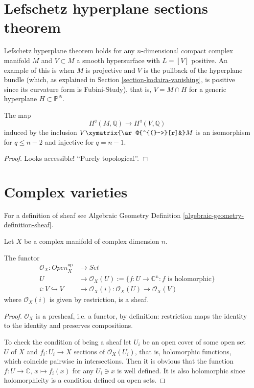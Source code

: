 \documentclass{book}
\begin{document}
\section{Lefschetz hyperplane sections
theorem}
\label{section-lefschetz-hyperplane}

Lefschetz hyperplane theorem holds for
any $n$-dimensional compact complex manifold
$M$
and $V \subset M$ a smooth hypersurface with
$L=[V]$ positive.
An example of this is when $M$ is projective
and $V$ is the pullback of the hyperplane
bundle
(which, as explained in Section
\ref{section-kodaira-vanishing},
is positive since its curvature form is
Fubini-Study),
that is, $V=M \cap H$ for a generic
hyperplane $H \subset \mathbb{P}^N$.

\begin{theorem}
\label{theorem-lefschetz-hyperplane}
The map
$$
H^q(M,\mathbb{Q}) \to H^q(V,\mathbb{Q})
$$
induced by the inclusion $V
\xymatrix{\ar@{^{(}->}[r]&} M$
is an isomorphism for $q \leq  n-2$
and injective for $q=n-1$.
\end{theorem}

\begin{proof}
Looks accessible! ``Purely topological''.
\end{proof}

\section{Complex varieties}
\label{section-complex-varieties}

For a definition of sheaf
see Algebraic Geometry Definition
\ref{algebraic-geometry-definition-sheaf}.

\begin{lemma}
\label{lemma-O_X-is-a-sheaf}
Let $X$ be a complex manifold of complex
dimension $n$.

The functor
$$
\begin{aligned}
\mathcal{O}_X: \mathit{Open}_X^{\text{op}}
&\longrightarrow \mathit{Set}
\\
U &\longmapsto \mathcal{O}_X(U):=\{f:U\to
\mathbb{C}^n:
f \text{ is holomorphic}\}\\
i:V \hookrightarrow V &\longmapsto
\mathcal{O}_X(i):\mathcal{O}_X(U) \to
\mathcal{O}_X(V)
\end{aligned}
$$
where $\mathcal{O}_X(i)$ is given by
restriction,
is a sheaf.
\end{lemma}

\begin{proof}
$\mathcal{O}_X$ is a presheaf,
i.e. a functor,
by definition: restriction
maps the identity to the identity
and preserves compositions.

To check the condition of being a sheaf let
$U_i$ be an open cover of some open set $U$
of $X$
and $f_i:U_i \to X$ sections of
$\mathcal{O}_X(U_i)$,
that is, holomorphic functions, which
coincide pairwise in intersections.
Then it is obvious that the function $f:U \to
\mathbb{C}$,
$x \mapsto f_i(x)$ for any $U_i \ni x$
is well defined. It is also holomorphic
since holomorphicity is a condition defined
on
open sets.
\end{proof}
\end{document}
